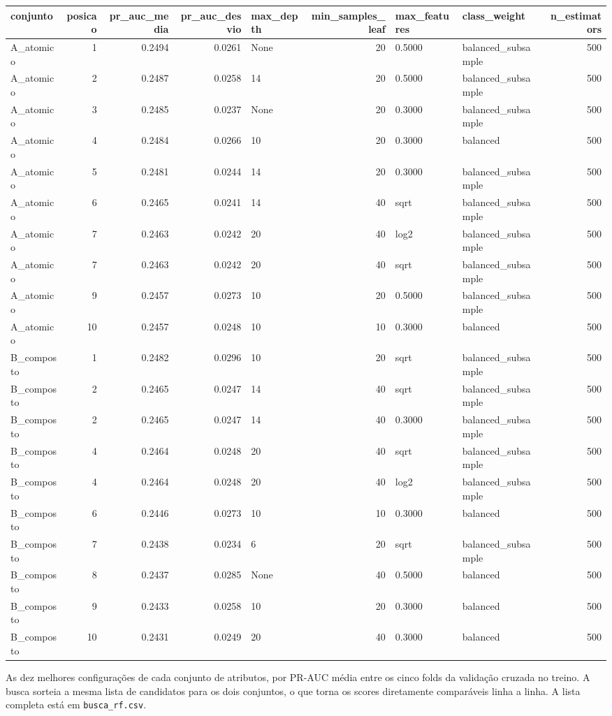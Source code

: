 \begin{tabular}{lrrrlrllr}
\toprule
conjunto & posicao & pr_auc_media & pr_auc_desvio & max_depth & min_samples_leaf & max_features & class_weight & n_estimators \\
\midrule
A_atomico & 1 & 0.2494 & 0.0261 & None & 20 & 0.5000 & balanced_subsample & 500 \\
A_atomico & 2 & 0.2487 & 0.0258 & 14 & 20 & 0.5000 & balanced_subsample & 500 \\
A_atomico & 3 & 0.2485 & 0.0237 & None & 20 & 0.3000 & balanced_subsample & 500 \\
A_atomico & 4 & 0.2484 & 0.0266 & 10 & 20 & 0.3000 & balanced & 500 \\
A_atomico & 5 & 0.2481 & 0.0244 & 14 & 20 & 0.3000 & balanced_subsample & 500 \\
A_atomico & 6 & 0.2465 & 0.0241 & 14 & 40 & sqrt & balanced_subsample & 500 \\
A_atomico & 7 & 0.2463 & 0.0242 & 20 & 40 & log2 & balanced_subsample & 500 \\
A_atomico & 7 & 0.2463 & 0.0242 & 20 & 40 & sqrt & balanced_subsample & 500 \\
A_atomico & 9 & 0.2457 & 0.0273 & 10 & 20 & 0.5000 & balanced_subsample & 500 \\
A_atomico & 10 & 0.2457 & 0.0248 & 10 & 10 & 0.3000 & balanced & 500 \\
B_composto & 1 & 0.2482 & 0.0296 & 10 & 20 & sqrt & balanced_subsample & 500 \\
B_composto & 2 & 0.2465 & 0.0247 & 14 & 40 & sqrt & balanced_subsample & 500 \\
B_composto & 2 & 0.2465 & 0.0247 & 14 & 40 & 0.3000 & balanced_subsample & 500 \\
B_composto & 4 & 0.2464 & 0.0248 & 20 & 40 & sqrt & balanced_subsample & 500 \\
B_composto & 4 & 0.2464 & 0.0248 & 20 & 40 & log2 & balanced_subsample & 500 \\
B_composto & 6 & 0.2446 & 0.0273 & 10 & 10 & 0.3000 & balanced & 500 \\
B_composto & 7 & 0.2438 & 0.0234 & 6 & 20 & sqrt & balanced_subsample & 500 \\
B_composto & 8 & 0.2437 & 0.0285 & None & 40 & 0.5000 & balanced & 500 \\
B_composto & 9 & 0.2433 & 0.0258 & 10 & 20 & 0.3000 & balanced & 500 \\
B_composto & 10 & 0.2431 & 0.0249 & 20 & 40 & 0.3000 & balanced & 500 \\
\bottomrule
\end{tabular}

\begin{flushleft}
\footnotesize As dez melhores configurações de cada conjunto de atributos, por PR-AUC média entre os cinco folds da validação cruzada no treino. A busca sorteia a mesma lista de candidatos para os dois conjuntos, o que torna os scores diretamente comparáveis linha a linha. A lista completa está em \texttt{busca\_rf.csv}.
\end{flushleft}
